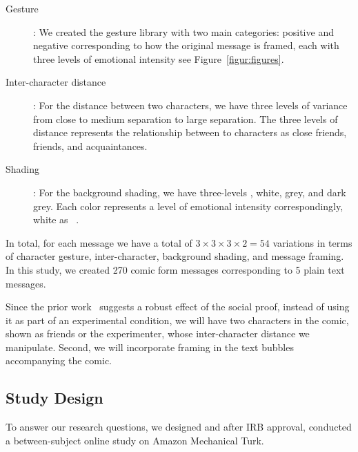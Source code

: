 \begin{description}
	\item[Gesture]: We created the gesture library with two main categories: positive and negative corresponding to how the original message is framed, each with three levels of emotional intensity see Figure~\ref{figur:figures}.
	\item[Inter-character distance]: For the distance between two characters, we have three levels of variance from close to medium separation to large separation. The three levels of distance represents the relationship between to characters as close friends, friends, and acquaintances.
	\item[Shading]: For the background shading, we have three-levels , white, grey, and dark grey. Each color represents a level of emotional intensity correspondingly, white as ~\cite{scott1993understanding}.
\end{description}



In total, for each message we have a total of $3 \times 3 \times 3 \times 2 =54$ variations in terms of character gesture, inter-character, background shading, and message framing. In this study, we created 270 comic form messages corresponding to 5 plain text messages.

Since the prior work~\cite{goldstein2008room,schultz2007constructive} suggests a robust effect of the social proof, instead of using it as part of an experimental condition, we will have two characters in the comic, shown as friends or the experimenter, whose inter-character distance we manipulate. Second, we will incorporate framing in the text bubbles accompanying the comic.

\subsection{Study Design}
To answer our research questions, we designed and after IRB approval, conducted a between-subject online study on Amazon Mechanical Turk.

